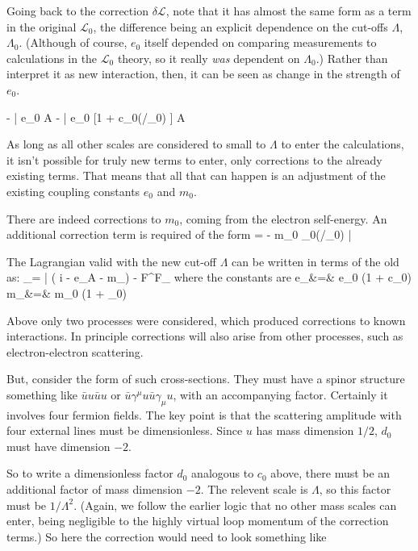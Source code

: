 Going back to the correction $\delta \mathcal{L}$, note that it has almost the same form as a term in the original $\mathcal{L}_0$, the difference being an explicit dependence on the cut-offs $\Lambda$, $\Lambda_0$.  (Although of course, $e_0$ itself depended on comparing measurements to calculations in the $\mathcal{L}_0$ theory, so it really \emph{was} dependent on $\Lambda_0$.)  Rather than interpret it as new interaction, then, it can be seen as change in the strength of $e_0$.  

\beq
 - \bar{\Psi} e_0 A \cdot \gamma  \Psi \to - \bar{\Psi} e_0  [1 + c_0(\Lambda/\Lambda_0) ] A \cdot \gamma  \Psi
\eeq 

As long as all other scales are considered to small to $\Lambda$ to enter the calculations, it isn't possible for truly new terms to enter, only corrections to the already existing terms.  That means that all that can happen is an adjustment of the existing coupling constants $e_0$ and $m_0$.

There are indeed corrections to $m_0$, coming from the electron self-energy.  An additional correction term is required of the form
\beq
	\delta {} = - m_0  _0(\Lambda/\Lambda_0) \bar{\Psi} \Psi
\eeq

The Lagrangian valid with the new cut-off $\Lambda$ can be written in terms of the old as:
\beq
	_\Lambda = 
		\bar{\Psi} \left( i \partial \cdot \gamma - e_\Lambda A \cdot \gamma - m_\Lambda \right) \Psi -  F^{\mu\nu}F_{\mu\nu} 
\eeq 
where the constants are
\beqa
	e_\Lambda &=& e_0 (1 + c_0)				\\
	m_\Lambda &=& m_0 (1 + _0)
\eeqa


Above only two processes were considered, which produced corrections to known interactions.  In principle corrections will also arise from other processes, such as electron-electron scattering.

But, consider the form of such cross-sections.  They must have a spinor structure something like $\bar{u}u \bar{u} u$ or $\bar{u}\gamma^\mu u \bar{u} \gamma_\mu u$, with an accompanying factor.  Certainly it involves four fermion fields.  The key point is that the scattering amplitude with four external lines must be dimensionless.  Since $u$ has mass dimension $1/2$, $d_0$ must have dimension $-2$.  

So to write a dimensionless factor $d_0$ analogous to $c_0$ above, there must be an additional factor of mass dimension $-2$.  The relevent scale is $\Lambda$, so this factor must be $1/\Lambda^2$.  (Again, we follow the earlier logic that no other mass scales can enter, being negligible to the highly virtual loop momentum of the correction terms.)  So here the correction would need to look something like

